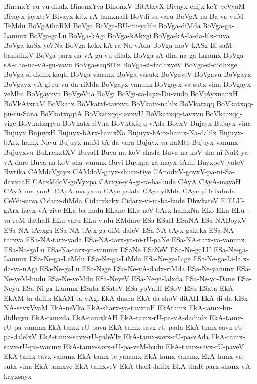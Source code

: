 {BinenxY-su-vu-dilalx
BinenxYva
BinonxV
BitAtxvX
Bivayx-cnijx-keY-veVyaM
Bivayx-jayxteV
Bivayx-kitx-rA-tamxnaH
BoVdi-su-varu
BoVgA-nu-Ba-va-vuM-TeMdu
BoVgAthaRM
BoVga
BoVga-BU-mi-yalilx
BoVga-diMda
BoVga-ga-Lanunx
BoVga-gaLu
BoVga-kAgi
BoVga-kAkxgi
BoVga-kA-la-da-lilx-ruva
BoVga-kaSx-yeVNa
BoVga-kekx-kA-ra-Na-vAda
BoVga-moV-kASx-Bi-saM-banidhxV
BoVga-parx-da-vA-gu-vu-dilalx
BoVga-sA-dha-na-ga-Lanunx
BoVga-sA-dha-na-vA-gu-vavu
BoVga-saqSiTx
BoVga-si-dadhxyeV
BoVga-si-didhxge
BoVga-si-didhx-kaqtf
BoVga-vanunx
BoVga-vasutx
BoVgaveV
BoVgavu
BoVgayx
BoVgayx-vA-gi-ru-vu-da-riMda
BoVgayx-vanunx
BoVgayx-va-sutx-vina
BoVgayx-veMba
BoVgayxvu
BoVgeVna
BoVgi
BoVgi-sa-lapx-Du-vudo
BoVjAyxnanxH
BoVkAtxraM
BoVkatx
BoVkatxf-tavxvu
BoVkatx-nalilx
BoVkatxqq
BoVkatxqq-pu-ru-Sana
BoVkatxqqtA
BoVkatxqq-tavxvU
BoVkatxqq-tavxvu
BoVkatxqq-vige
BoVkatxqqvu
BoVkatx-riVha
BoVktxfq-q-vAda
BoyxV
Bujayx
Bujayx-vina
Bujuyx
BujuyxH
Bujuyx-bArx-hamxNa
Bujuyx-bArx-hamx-Na-dalilx
Bujuyx-bArx-hamx-Navu
Bujuyx-muM-tA-da-vara
Bujuyx-va-naMte
Bujuyx-vanunx
Bujuyxvu
BuknekxtXV
BuvaH
Buva-na-koV-shada
Buva-na-koV-sha-ni-NaR-ya-vA-dare
Buva-na-koV-sha-vanunx
Buvi
Buyxpa-ga-mayx-tAmf
BuyxpeV-yateV
Bwtika
CAMdoVgayx
CAMdoV-gayx-shurx-tiye
CAnodxV-goyxV-pa-ni-Sa-davxcaH
CArxMdoV-goVyxpa
CArxye-yA-gi-ra-ba-hude
CAyA
CAyA-mayaH
CAyA-ma-yanU
CAyA-ma-yanu
CAye-yalalx
CAye-yiMda
CAye-yi-lalxdudx
CeVdi-suva
Cidarx-diMda
Cidarxkekx
Cidarx-vi-ra-ba-hude
DhwkateV
E
ELU-gArx-hayx-vA-give
ELa-ba-hudu
ELane
ELa-neV-bArx-hamxNa
ELo
ELu
ELu-va-reM-dathaR
ELu-varu
ELu-vudu
EMdare
ESa
ESaH
ESaNA
ESa-NABoyxV
ESa-NA-tAyxga
ESa-NA-tAyx-ga-diM-daleV
ESa-NA-tAyx-gakekx
ESa-NA-tarxya
ESa-NA-tarx-yada
ESa-NA-tarx-ya-ni-rU-paNe
ESa-NA-tarx-ya-vanunx
ESa-Na-gaLu
ESa-Na-tarx-ya-vanunx
ESaNe
ESaNeV
ESa-Ne-gaLU
ESa-Ne-ga-Lanunx
ESa-Ne-ga-LeMdu
ESa-Ne-ga-LiMda
ESa-Ne-ga-Lige
ESa-Ne-ga-Li-lalx-da-va-nAgi
ESa-Ne-gaLu
ESa-Nege
ESa-Ne-yA-dadx-riMda
ESa-Ne-yanunx
ESa-Ne-yeM-budu
ESa-Ne-yeMdu
ESa-NeyeV
ESa-Ne-yi-lalxda
ESa-Ne-yo-Dane
ESa-Neyu
ESa-Ni-ga-Lanunx
ESata
ESateV
ESa-yoVniH
ESoV
ESu
ESxta
EkA
EkAM-ta-dalilx
EkAM-ta-vAgi
EkA-dasha
EkA-da-shoV-ditAH
EkA-di-da-kiSx-NA-sevxVvaM
EkA-neVka
EkA-sharx-ya-tavxtaH
EkAtamx
EkA-tamx-bu-didhxyu
EkA-tamxda
EkA-tamxkAH
EkA-tamx-rU-pa-vA-dadudx
EkA-tamx-rU-pa-vanunx
EkA-tamx-rU-pavu
EkA-tamx-savx-rU-pada
EkA-tamx-savx-rU-pa-dalelxV
EkA-tamx-savx-rU-paleVlx
EkA-tamx-savx-rU-pa-vAda
EkA-tamx-savx-rU-pa-vanunx
EkA-tamx-savx-rU-pa-veM-budu
EkA-tamx-savx-rU-paveV
EkA-tamx-tavx-vanunx
EkA-tamx-te-yanunx
EkA-tamx-vanunx
EkA-tamx-va-sutx-vina
EkA-tamxve
EkA-tamxveV
EkA-thaR-dalilx
EkA-thaR-parx-shanx-vA-kayxsayx
}
